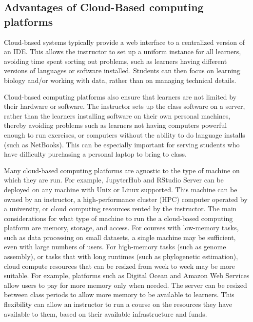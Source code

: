 \subsection{Advantages of Cloud-Based computing platforms}\label{subsub:cloud-advantage}

Cloud-based systems typically provide a web interface to a centralized version of an IDE. This 
allows the instructor to set up a uniform instance for all learners, avoiding time spent sorting out problems, such as learners having different versions of languages or software installed.
Students can then focus on learning biology and/or working with data, rather than on managing technical details.

Cloud-based computing platforms also ensure that learners
are not limited by their hardware or software. The instructor sets up the class software on a server, rather than the learners installing software on their own personal machines, thereby avoiding problems such as learners not having computers powerful enough to run exercises, or computers without the ability to do language installs (such as NetBooks). This can be especially important for serving students who have difficulty purchasing a personal laptop to bring to class.

Many cloud-based computing platforms are agnostic to the type of machine on which they are run. 
For example, JupyterHub and RStudio Server can be deployed on any machine with Unix or Linux supported. 
This machine can be owned by an instructor, a high-performance cluster (HPC) computer operated by a university, or cloud 
computing resources rented by the instructor.
The main considerations for what type of machine to run the a cloud-based computing platform are memory, storage, and access.
For courses with low-memory tasks, such as data processing on small datasets, a single machine may be sufficient, even with large numbers of users.
For high-memory tasks (such as genome assembly), or tasks that with long runtimes (such as phylogenetic estimation), 
cloud compute resources that can be resized from week to week may be more suitable.
For example, platforms such as Digital Ocean and Amazon Web Services allow users to pay for more memory only when needed. 
The server can be resized between class periods to allow more memory to be available to learners.
This flexibility can allow an instructor to run a course on the resources they have available to them, based on their available infrastructure and funds.


